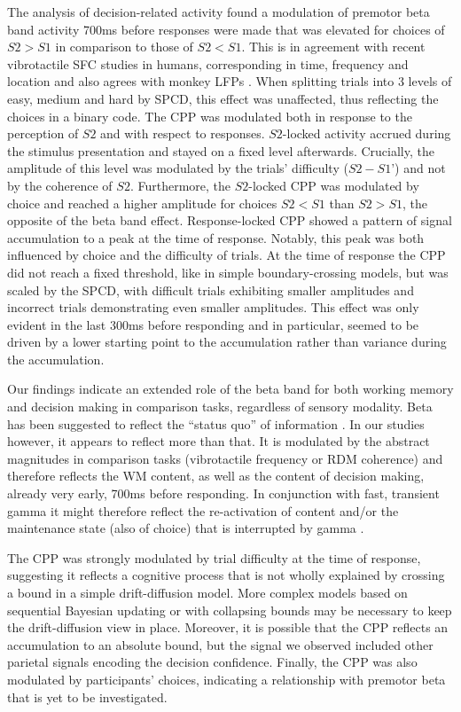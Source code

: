 The analysis of decision-related activity found a modulation of premotor beta band activity 700ms before responses were made that was elevated for choices of $S2>S1$ in comparison to those of $S2<S1$. This is in agreement with recent vibrotactile SFC studies in humans, corresponding in time, frequency and location \parencite{Herding2016} and also agrees with monkey LFPs \parencite{Haegens2011,Haegens2017}. When splitting trials into 3 levels of easy, medium and hard by SPCD, this effect was unaffected, thus reflecting the choices in a binary code. 
The CPP was modulated both in response to the perception of $S2$ and with respect to responses. $S2$-locked activity accrued during the stimulus presentation and stayed on a fixed level afterwards. Crucially, the amplitude of this level was modulated by the trials’ difficulty ($S2-S1’$) and not by the coherence of $S2$. Furthermore, the $S2$-locked CPP was modulated by choice and reached a higher amplitude for choices $S2<S1$ than $S2>S1$, the opposite of the beta band effect. Response-locked CPP showed a pattern of signal accumulation to a peak at the time of response. Notably, this peak was both influenced by choice and the difficulty of trials. At the time of response the CPP did not reach a fixed threshold, like in simple boundary-crossing models, but was scaled by the SPCD, with difficult trials exhibiting smaller amplitudes and incorrect trials demonstrating even smaller amplitudes. This effect was only evident in the last 300ms before responding and in particular, seemed to be driven by a lower starting point to the accumulation rather than variance during the accumulation.

Our findings indicate an extended role of the beta band for both working memory and decision making in comparison tasks, regardless of sensory modality. Beta has been suggested to reflect the “status quo” of information \parencite{Engel2010}. In our studies however, it appears to reflect more than that. It is modulated by the abstract magnitudes in comparison tasks (vibrotactile frequency or RDM coherence) and therefore reflects the WM content, as well as the content of decision making, already very early, 700ms before responding. In conjunction with fast, transient gamma it might therefore reflect the re-activation of content \parencite{Spitzer2017} and/or the maintenance state (also of choice) that is interrupted by gamma \parencite{Lundqvist2018}.

The CPP was strongly modulated by trial difficulty at the time of response, suggesting it reflects a cognitive process that is not wholly explained by crossing a bound in a simple drift-diffusion model. More complex models based on sequential Bayesian updating or with collapsing bounds may be necessary to keep the drift-diffusion view in place. Moreover, it is possible that the CPP reflects an accumulation to an absolute bound, but the signal we observed included other parietal signals encoding the decision confidence. Finally, the CPP was also modulated by participants' choices, indicating a relationship with premotor beta that is yet to be investigated.

